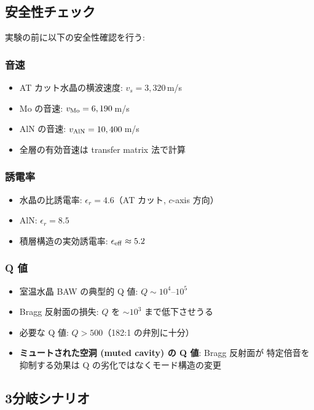 \documentclass[11pt,a4paper]{article}
\begin{document}
\subsection{安全性チェック}

実験の前に以下の安全性確認を行う:

\subsubsection{音速}

\begin{itemize}
\item AT カット水晶の横波速度: $v_s = 3,320$\,m/s
\item Mo の音速: $v_{\rm Mo} = 6,190$\,m/s
\item AlN の音速: $v_{\rm AlN} = 10,400$\,m/s
\item 全層の有効音速は transfer matrix 法で計算
\end{itemize}

\subsubsection{誘電率}

\begin{itemize}
\item 水晶の比誘電率: $\epsilon_r = 4.6$（AT カット, $c$-axis 方向）
\item AlN: $\epsilon_r = 8.5$
\item 積層構造の実効誘電率: $\epsilon_{\rm eff} \approx 5.2$
\end{itemize}

\subsubsection{Q 値}

\begin{itemize}
\item 室温水晶 BAW の典型的 Q 値: $Q \sim 10^4$--$10^5$
\item Bragg 反射面の損失: $Q$ を $\sim 10^3$ まで低下させうる
\item 必要な Q 値: $Q > 500$（182:1 の弁別に十分）
\item \textbf{ミュートされた空洞 (muted cavity) の Q 値}: Bragg 反射面が
  特定倍音を抑制する効果は Q の劣化ではなくモード構造の変更
\end{itemize}

\subsection{3分岐シナリオ}
\end{document}

